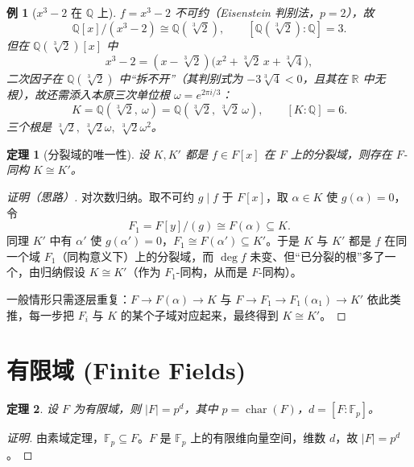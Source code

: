 \documentclass[11pt,a4paper]{ctexart}
\newtheorem*{theorem}{定理}
\newtheorem*{example}{例}
\theoremstyle{remark}
\DeclareMathOperator{\chr}{char}
\newcommand{\Fp}{\mathbb{F}_p}
\begin{document}
\begin{example}[$x^{3}-2$ 在 $\mathbb{Q}$ 上]
$f=x^{3}-2$ 不可约（Eisenstein 判别法，$p=2$），故
\[
\mathbb{Q}[x]/(x^{3}-2)\cong\mathbb{Q}(\sqrt[3]{2}),\qquad[\mathbb{Q}(\sqrt[3]{2}):\mathbb{Q}]=3 .
\]
但在 $\mathbb{Q}(\sqrt[3]{2})[x]$ 中
\[
x^{3}-2=(x-\sqrt[3]{2})\bigl(x^{2}+\sqrt[3]{2}\,x+\sqrt[3]{4}\bigr),
\]
二次因子在 $\mathbb{Q}(\sqrt[3]{2})$ 中“拆不开”（其判别式为 $-3\sqrt[3]{4}<0$，且其在 $\mathbb{R}$ 中无根），故还需添入本原三次单位根 $\omega=e^{2\pi i/3}$：
\[
K=\mathbb{Q}(\sqrt[3]{2},\ \omega)=\mathbb{Q}(\sqrt[3]{2},\ \sqrt[3]{2}\,\omega),\qquad[K:\mathbb{Q}]=6 .
\]
三个根是 $\sqrt[3]{2},\ \sqrt[3]{2}\omega,\ \sqrt[3]{2}\omega^{2}$。
\end{example}

\begin{theorem}[分裂域的唯一性]
设 $K,K'$ 都是 $f\in F[x]$ 在 $F$ 上的分裂域，则存在 $F$-同构 $K\cong K'$。
\end{theorem}

\begin{proof}[证明（思路）]
对次数归纳。取不可约 $g\mid f$ 于 $F[x]$，取 $\alpha\in K$ 使 $g(\alpha)=0$，令
\[
F_1=F[y]/(g)\cong F(\alpha)\subseteq K .
\]
同理 $K'$ 中有 $\alpha'$ 使 $g(\alpha')=0$，$F_1\cong F(\alpha')\subseteq K'$。于是 $K$ 与 $K'$ 都是 $f$ 在同一个域 $F_1$（同构意义下）上的分裂域，而 $\deg f$ 未变、但“已分裂的根”多了一个，由归纳假设 $K\cong K'$（作为 $F_1$-同构，从而是 $F$-同构）。
\begin{center}
\end{center}
一般情形只需逐层重复：$F\to F(\alpha)\to K$ 与 $F\to F_1\to F_1(\alpha_1)\to K'$ 依此类推，每一步把 $F_i$ 与 $K$ 的某个子域对应起来，最终得到 $K\cong K'$。
\end{proof}

\section*{有限域 (Finite Fields)}

\begin{theorem}
设 $F$ 为有限域，则 $|F|=p^{d}$，其中 $p=\chr(F)$，$d=[F:\Fp]$。
\end{theorem}

\begin{proof}[证明]
由素域定理，$\Fp\subseteq F$。$F$ 是 $\Fp$ 上的有限维向量空间，维数 $d$，故 $|F|=p^{d}$。
\end{proof}
\end{document}
